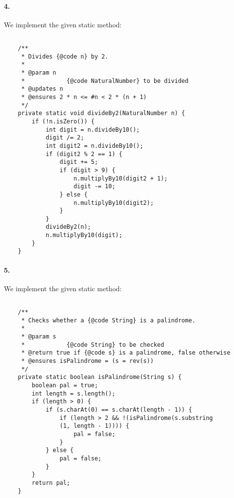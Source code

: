 \documentclass[10pt]{article}
\begin{document}
\paragraph{4. } We implement the given static method: 
\begin{lstlisting} 

    /**
     * Divides {@code n} by 2.
     *
     * @param n
     *            {@code NaturalNumber} to be divided
     * @updates n
     * @ensures 2 * n <= #n < 2 * (n + 1)
     */
    private static void divideBy2(NaturalNumber n) {
        if (!n.isZero()) {
            int digit = n.divideBy10();
            digit /= 2;
            int digit2 = n.divideBy10();
            if (digit2 % 2 == 1) {
                digit += 5;
                if (digit > 9) {
                    n.multiplyBy10(digit2 + 1);
                    digit -= 10;
                } else {
                    n.multiplyBy10(digit2);
                }
            }
            divideBy2(n);
            n.multiplyBy10(digit);
        }
    }

\end{lstlisting}

\paragraph{5. } We implement the given static method: 
\begin{lstlisting} 

    /**
     * Checks whether a {@code String} is a palindrome.
     *
     * @param s
     *            {@code String} to be checked
     * @return true if {@code s} is a palindrome, false otherwise
     * @ensures isPalindrome = (s = rev(s))
     */
    private static boolean isPalindrome(String s) {
        boolean pal = true;
        int length = s.length();
        if (length > 0) {
            if (s.charAt(0) == s.charAt(length - 1)) {
                if (length > 2 && !(isPalindrome(s.substring
                (1, length - 1)))) {
                    pal = false;
                }
            } else {
                pal = false;
            }
        }
        return pal;
    }

\end{lstlisting}
\end{document}
